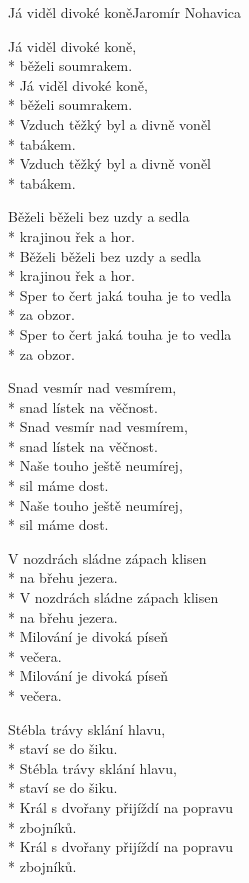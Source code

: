 \documentclass[10.5pt]{book}
\begin{document}
\begin{poem}{Já viděl divoké koně}{Jaromír Nohavica}

\settowidth{\versewidth}{Běželi běželi bez uzdy a sedla}

Já viděl divoké koně, \\*
běželi soumrakem.\\*
Já viděl divoké koně,\\*
běželi soumrakem.\\*
Vzduch těžký byl a divně voněl\\*
tabákem.\\*
Vzduch těžký byl a divně voněl\\*
tabákem.

Běželi běželi bez uzdy a sedla\\*
krajinou řek a hor.\\*
Běželi běželi bez uzdy a sedla\\*
krajinou řek a hor.\\*
Sper to čert jaká touha je to vedla\\*
za obzor.\\*
Sper to čert jaká touha je to vedla\\*
za obzor.

Snad vesmír nad vesmírem, \\*
snad lístek na věčnost.\\*
Snad vesmír nad vesmírem, \\*
snad lístek na věčnost.\\*
Naše touho ještě neumírej,\\* 
sil máme dost.\\*
Naše touho ještě neumírej, \\*
sil máme dost.

V nozdrách sládne zápach klisen \\*
na břehu jezera.\\*
V nozdrách sládne zápach klisen \\*
na břehu jezera.\\*
Milování je divoká píseň \\*
večera.\\*
Milování je divoká píseň \\*
večera.

Stébla trávy sklání hlavu, \\*
staví se do šiku.\\*
Stébla trávy sklání hlavu, \\*
staví se do šiku.\\*
Král s dvořany přijíždí na popravu \\*
zbojníků.\\*
Král s dvořany přijíždí na popravu \\*
zbojníků.


\end{poem}
\end{document}
